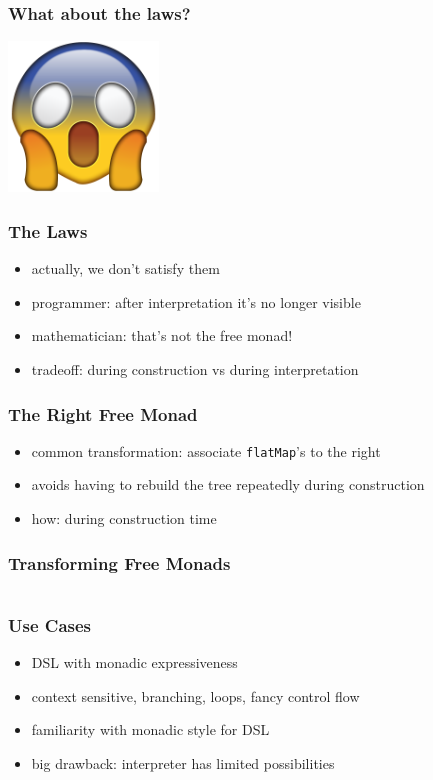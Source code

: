 \documentclass{beamer}
\begin{document}
\begin{frame}[fragile]
  \frametitle{What about the laws?}
  \begin{center}
    \includegraphics[width=0.3\textwidth]{static-images/scream.png}
  \end{center}
\end{frame}

\begin{frame}[fragile]
  \frametitle{The Laws}
  \begin{itemize}
  \item actually, we don't satisfy them
  \item programmer: after interpretation it's no longer visible
  \item mathematician: that's not the free monad!
  \item tradeoff: during construction vs during interpretation
  \end{itemize}
\end{frame}

\begin{frame}[fragile]
  \frametitle{The Right Free Monad}
  \begin{itemize}
  \item common transformation: associate \texttt{flatMap}'s to the right
  \item avoids having to rebuild the tree repeatedly during construction
  \item how: during construction time
  \end{itemize}
\end{frame}

\begin{frame}[fragile]
  \frametitle{Transforming Free Monads}
  \inputminted[highlightlines={5-6}, highlightcolor=yellow]{scala}{snippets/opt-free-instance.scala}
\end{frame}

\begin{frame}
  \frametitle{Use Cases}
  \begin{itemize}
  \item DSL with monadic expressiveness
  \item context sensitive, branching, loops, fancy control flow
  \item familiarity with monadic style for DSL
  \item big drawback: interpreter has limited possibilities
  \end{itemize}
\end{frame}
\end{document}
